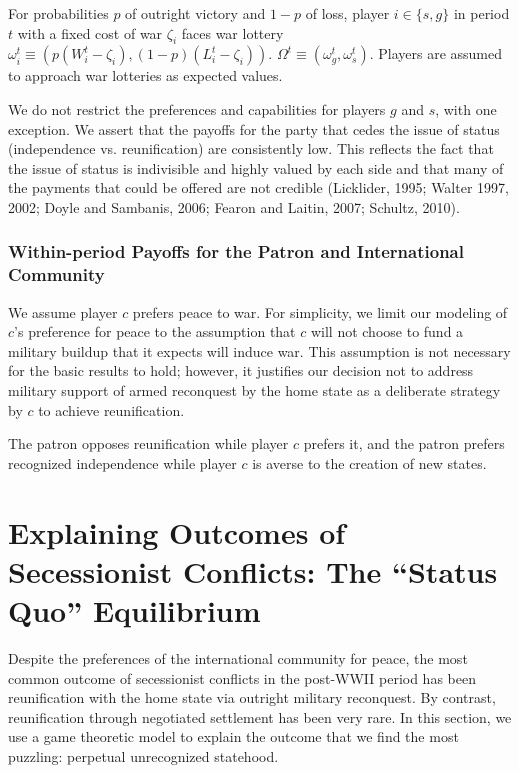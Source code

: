For probabilities $p$ of outright victory and $1-p$ of loss, player $i \in \{s, g\}$ in period $t$ with a fixed cost of war $\zeta_i$ faces war lottery $\omega_i^t \equiv (p (W_i^t-\zeta_i), \left(1-p\right)( L_i^t-\zeta_i))$. $\Omega^t \equiv (\omega_g^t, \omega_s^t).$ Players are assumed to approach war lotteries as expected values.

We do not restrict the preferences and capabilities for players $g$ and $s$, with one exception. We assert that the payoffs for the party that cedes the issue of status (independence vs. reunification) are consistently low. This reflects the fact that the issue of status is indivisible and highly valued by each side and that many of the payments that could be offered are not credible (Licklider, 1995; Walter 1997, 2002; Doyle and Sambanis, 2006; Fearon and Laitin, 2007; Schultz, 2010).



\subsubsection{Within-period Payoffs for the Patron and International Community}
We assume player $c$ prefers peace to war. For simplicity, we limit our modeling of $c$'s preference for peace to the assumption that $c$ will not choose to fund a military buildup that it expects will induce war. This assumption is not necessary for the basic results to hold; however, it justifies our decision not to address military support of armed reconquest by the home state as a deliberate strategy by $c$ to achieve reunification. 

The patron opposes reunification while player $c$ prefers it, and the patron prefers recognized independence while player $c$ is averse to the creation of new states.


\section{Explaining Outcomes of Secessionist Conflicts: The ``Status Quo'' Equilibrium} 
\label{sec:main}

Despite the preferences of the international community for peace, the most common outcome of secessionist conflicts in the post-WWII period has been reunification with the home state via outright military reconquest. By contrast, reunification through negotiated settlement has been very rare. In this section, we use a game theoretic model to explain the outcome that we find the most puzzling: perpetual unrecognized statehood.

